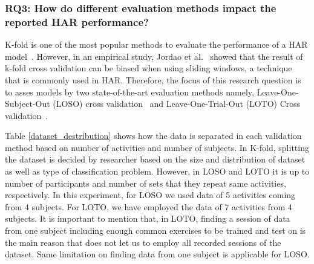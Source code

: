 \documentclass[journal,article,submit,moreauthors,pdftex]{Definitions/mdpi}
\begin{document}
\subsubsection{RQ3: How do different evaluation methods impact the reported HAR performance?}

K-fold is one of the most popular methods to evaluate the performance of a HAR model~\cite{wang2019survey}. However, in an empirical study, Jordao et al.~\cite{jordao2018human} showed that the result of k-fold cross validation can be biased when using sliding windows, a technique that is commonly used in HAR. Therefore, the focus of this research question is to asses models by two state-of-the-art evaluation methods namely, Leave-One-Subject-Out (LOSO) cross validation~\cite{liu2011multisensor} and Leave-One-Trial-Out (LOTO) Cross validation~\cite{sena2018multiscale,jordao2018human}. 

Table \ref{dataset_destribution} shows how the data is separated in each validation method based on number of activities and number of subjects. In K-fold, splitting the dataset is decided by researcher based on the size and distribution of dataset as well as type of classification problem\cite{jordao2018human}. However, in LOSO and LOTO it is up to number of participants and number of sets that they repeat same activities, respectively. In this experiment, for LOSO we used data of 5 activities coming from 4 subjects. For LOTO, we have employed the data of 7 activities from 4 subjects. It is important to mention that, in LOTO, finding a session of data from one subject including enough common exercises to be trained and test on is the main reason that does not let us to employ all recorded sessions of the dataset. Same limitation on finding data from one subject is applicable for LOSO.
\end{document}
